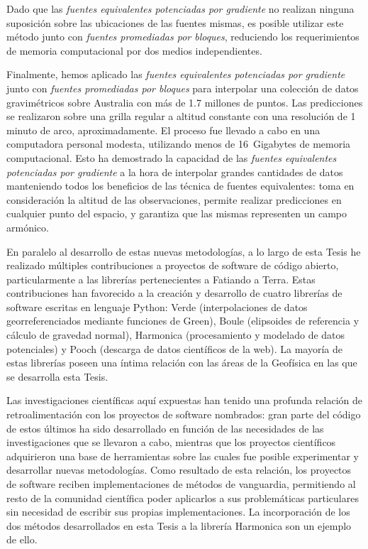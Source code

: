 Dado que las \emph{fuentes equivalentes potenciadas por gradiente} no realizan
ninguna suposición sobre las ubicaciones de las fuentes mismas, es posible
utilizar este método junto con \emph{fuentes promediadas por bloques},
reduciendo los requerimientos de memoria computacional por dos medios
independientes.

Finalmente, hemos aplicado las \emph{fuentes equivalentes potenciadas por
gradiente} junto con \emph{fuentes promediadas por bloques} para interpolar una
colección de datos gravimétricos sobre Australia con más de 1.7 millones de
puntos.
Las predicciones se realizaron sobre una grilla regular a altitud constante con
una resolución de 1 minuto de arco, aproximadamente.
El proceso fue llevado a cabo en una computadora personal modesta, utilizando
menos de 16~Gigabytes de memoria computacional.
Esto ha demostrado la capacidad de las \emph{fuentes equivalentes potenciadas
por gradiente} a la hora de interpolar grandes cantidades de datos manteniendo
todos los beneficios de las técnica de fuentes equivalentes: toma en
consideración la altitud de las observaciones, permite realizar predicciones en
cualquier punto del espacio, y garantiza que las mismas representen un campo
armónico.

\vspace{1em}

En paralelo al desarrollo de estas nuevas metodologías, a lo largo de esta
Tesis he realizado múltiples contribuciones a proyectos de software de código
abierto, particularmente a las librerías pertenecientes a Fatiando a Terra.
Estas contribuciones han favorecido a la creación y desarrollo de cuatro
librerías de software escritas en lenguaje Python: Verde (interpolaciones de
datos georreferenciados mediante funciones de Green), Boule (elipsoides de
referencia y cálculo de gravedad normal), Harmonica (procesamiento y modelado
de datos potenciales) y Pooch (descarga de datos científicos de la web).
La mayoría de estas librerías poseen una íntima relación con las áreas de la
Geofísica en las que se desarrolla esta Tesis.

Las investigaciones científicas aquí expuestas han tenido una profunda relación
de retroalimentación con los proyectos de software nombrados: gran parte del
código de estos últimos ha sido desarrollado en función de las necesidades de
las investigaciones que se llevaron a cabo,  mientras que los proyectos
científicos adquirieron una base de herramientas sobre las cuales fue posible
experimentar y desarrollar nuevas metodologías.
Como resultado de esta relación, los proyectos de software reciben
implementaciones de métodos de vanguardia, permitiendo al resto de la comunidad
científica poder aplicarlos a sus problemáticas particulares sin necesidad de
escribir sus propias implementaciones.
La incorporación de los dos métodos desarrollados en esta Tesis a la librería
Harmonica son un ejemplo de ello.

